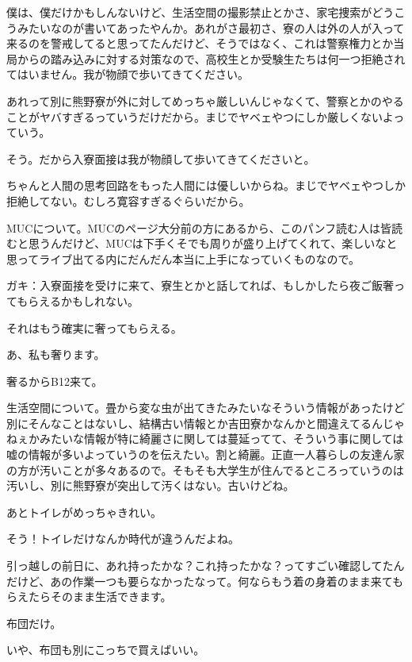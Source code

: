 \begin{multicols}{2}
僕は、僕だけかもしんないけど、生活空間の撮影禁止とかさ、家宅捜索がどうこうみたいなのが書いてあったやんか。あれがさ最初さ、寮の人は外の人が入って来るのを警戒してると思ってたんだけど、そうではなく、これは警察権力とか当局からの踏み込みに対する対策なので、高校生とか受験生たちは何一つ拒絶されてはいません。我が物顔で歩いてきてください。

あれって別に熊野寮が外に対してめっちゃ厳しいんじゃなくて、警察とかのやることがヤバすぎるっていうだけだから。まじでヤベェやつにしか厳しくないよっていう。

そう。だから入寮面接は我が物顔して歩いてきてくださいと。

ちゃんと人間の思考回路をもった人間には優しいからね。まじでヤベェやつしか拒絶してない。むしろ寛容すぎるぐらいだから。

MUCについて。MUCのページ大分前の方にあるから、このパンフ読む人は皆読むと思うんだけど、MUCは下手くそでも周りが盛り上げてくれて、楽しいなと思ってライブ出てる内にだんだん本当に上手になっていくものなので。

ガキ：入寮面接を受けに来て、寮生とかと話してれば、もしかしたら夜ご飯奢ってもらえるかもしれない。

それはもう確実に奢ってもらえる。

あ、私も奢ります。

奢るからB12来て。

生活空間について。畳から変な虫が出てきたみたいなそういう情報があったけど別にそんなことはないし、結構古い情報とか吉田寮かなんかと間違えてるんじゃねぇかみたいな情報が特に綺麗さに関しては蔓延ってて、そういう事に関しては嘘の情報が多いよっていうのを伝えたい。割と綺麗。正直一人暮らしの友達ん家の方が汚いことが多々あるので。そもそも大学生が住んでるところっていうのは汚いし、別に熊野寮が突出して汚くはない。古いけどね。

あとトイレがめっちゃきれい。

そう！トイレだけなんか時代が違うんだよね。

引っ越しの前日に、あれ持ったかな？これ持ったかな？ってすごい確認してたんだけど、あの作業一つも要らなかったなって。何ならもう着の身着のまま来てもらえたらそのまま生活できます。

布団だけ。

いや、布団も別にこっちで買えばいい。


\end{multicols}
